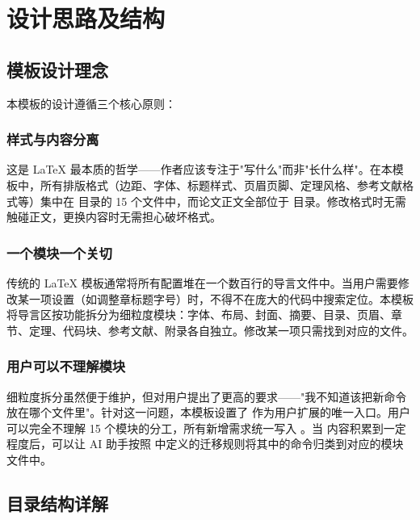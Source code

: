 \documentclass[../main-manual.tex]{subfiles}
\begin{document}
\cleardoublepage
\thispagestyle{empty}
 \songti
\setlength{\baselineskip}{24pt}
\RaggedRight
\setlength{\parindent}{2em}
\raggedbottom

\chapter{设计思路及结构} \label{ch:design}

\section{模板设计理念}

本模板的设计遵循三个核心原则：

\subsection{样式与内容分离}

这是 \LaTeX{} 最本质的哲学——作者应该专注于"写什么"而非"长什么样"。在本模板中，所有排版格式（边距、字体、标题样式、页眉页脚、定理风格、参考文献格式等）集中在  目录的 15 个文件中，而论文正文全部位于  目录。修改格式时无需触碰正文，更换内容时无需担心破坏格式。

\subsection{一个模块一个关切}

传统的 \LaTeX{} 模板通常将所有配置堆在一个数百行的导言文件中。当用户需要修改某一项设置（如调整章标题字号）时，不得不在庞大的代码中搜索定位。本模板将导言区按功能拆分为细粒度模块：字体、布局、封面、摘要、目录、页眉、章节、定理、代码块、参考文献、附录各自独立。修改某一项只需找到对应的文件。

\subsection{用户可以不理解模块}

细粒度拆分虽然便于维护，但对用户提出了更高的要求——"我不知道该把新命令放在哪个文件里"。针对这一问题，本模板设置了  作为用户扩展的唯一入口。用户可以完全不理解 15 个模块的分工，所有新增需求统一写入 。当  内容积累到一定程度后，可以让 AI 助手按照  中定义的迁移规则将其中的命令归类到对应的模块文件中。

\section{目录结构详解}
\end{document}

